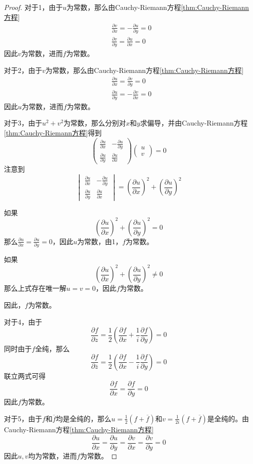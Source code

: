 \documentclass[lang = cn, scheme = chinese, thmcnt = section]{elegantbook}
\begin{document}
\begin{proof}
	对于1，由于$u$为常数，那么由Cauchy-Riemann方程\ref{thm:Cauchy-Riemann方程}
	\begin{align*}
		& \frac{\partial v}{\partial x}=-\frac{\partial u}{\partial y}=0\\
		& \frac{\partial v}{\partial y}=\frac{\partial u}{\partial x}=0
	\end{align*}
	因此$v$为常数，进而$f$为常数。
	
	对于2，由于$v$为常数，那么由Cauchy-Riemann方程\ref{thm:Cauchy-Riemann方程}
	\begin{align*}
		& \frac{\partial u}{\partial x}=\frac{\partial v}{\partial y}=0\\
		& \frac{\partial u}{\partial y}=-\frac{\partial v}{\partial x}=0
	\end{align*}
	因此$u$为常数，进而$f$为常数。
	
	对于3，由于$u^2+v^2$为常数，那么分别对$x$和$y$求偏导，并由Cauchy-Riemann方程\ref{thm:Cauchy-Riemann方程}得到
	$$
	\begin{pmatrix}
		\frac{\partial u}{\partial x}&-\frac{\partial u}{\partial y}\\
		\frac{\partial u}{\partial y}&\frac{\partial u}{\partial x}
	\end{pmatrix}
	\begin{pmatrix}
		u\\v
	\end{pmatrix}=0
	$$
	注意到%
	$$
	\begin{vmatrix}\frac{\partial u}{\partial x}&-\frac{\partial u}{\partial y}\\\frac{\partial u}{\partial y}&\frac{\partial u}{\partial x}\end{vmatrix}=\left(\frac{\partial u}{\partial x}\right)^2+\left(\frac{\partial u}{\partial y}\right)^2
	$$
	
	如果%
	$$
	\left(\frac{\partial u}{\partial x}\right)^2+\left(\frac{\partial u}{\partial y}\right)^2=0
	$$
	那么$\frac{\partial u}{\partial x}=\frac{\partial u}{\partial y}=0$，因此$u$为常数，由1，$f$为常数。
	
	如果
	$$
	\left(\frac{\partial u}{\partial x}\right)^2+\left(\frac{\partial u}{\partial y}\right)^2\ne0
	$$
	那么上式存在唯一解$u=v=0$，因此$f$为常数。
	
	因此，$f$为常数。
	
	对于4，由于
	$$
	\frac{\partial f}{\partial z}=\frac{1}{2}\left(\frac{\partial f}{\partial x}+\frac{1}{i}\frac{\partial f}{\partial y}\right)=0
	$$
	同时由于$f$​全纯，那么
	$$
	\frac{\partial f}{\partial \overline{z}}=\frac{1}{2}\left(\frac{\partial f}{\partial x}-\frac{1}{i}\frac{\partial f}{\partial y}\right)=0
	$$
	联立两式可得
	$$
	\frac{\partial f}{\partial x}=\frac{\partial f}{\partial y}=0
	$$
	因此$f$为常数。
	
	对于5，由于$f$和$\overline{f}$均是全纯的，那么$u=\frac{1}{2}(f+\overline{f})$和$v=\frac{1}{2i}(f+\overline{f})$​是全纯的。由Cauchy-Riemann方程\ref{thm:Cauchy-Riemann方程}
	$$
	\frac{\partial u}{\partial x}=\frac{\partial u}{\partial y}=\frac{\partial v}{\partial x}=\frac{\partial v}{\partial y}=0
	$$
	因此$u,v$均为常数，进而$f$为常数。
\end{proof}
\end{document}
